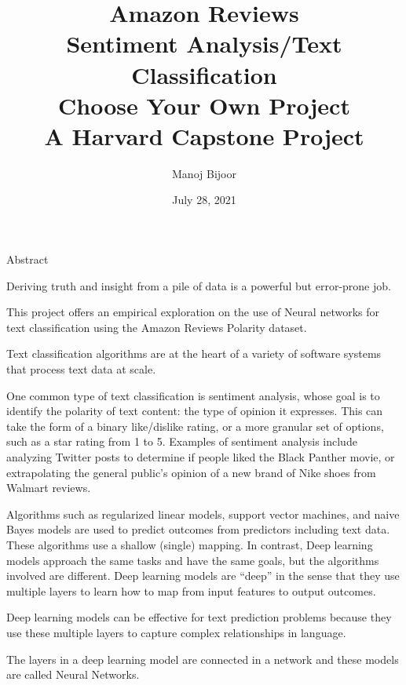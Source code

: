 \documentclass[
]{article}
\title{Amazon Reviews\\
Sentiment Analysis/Text Classification\\
Choose Your Own Project\\
A Harvard Capstone Project}
\author{Manoj Bijoor}
\date{July 28, 2021}
\begin{document}
\maketitle



\newpage

\newpage

\begin{center}

\hypertarget{Abstract}{}
\large{Abstract}

\end{center}

\bigskip

Deriving truth and insight from a pile of data is a powerful but
error-prone job.

This project offers an empirical exploration on the use of Neural
networks for text classification using the Amazon Reviews Polarity
dataset.

Text classification algorithms are at the heart of a variety of software
systems that process text data at scale.

One common type of text classification is sentiment analysis, whose goal
is to identify the polarity of text content: the type of opinion it
expresses. This can take the form of a binary like/dislike rating, or a
more granular set of options, such as a star rating from 1 to 5.
Examples of sentiment analysis include analyzing Twitter posts to
determine if people liked the Black Panther movie, or extrapolating the
general public's opinion of a new brand of Nike shoes from Walmart
reviews.

Algorithms such as regularized linear models, support vector machines,
and naive Bayes models are used to predict outcomes from predictors
including text data. These algorithms use a shallow (single) mapping. In
contrast, Deep learning models approach the same tasks and have the same
goals, but the algorithms involved are different. Deep learning models
are ``deep'' in the sense that they use multiple layers to learn how to
map from input features to output outcomes.

Deep learning models can be effective for text prediction problems
because they use these multiple layers to capture complex relationships
in language.

The layers in a deep learning model are connected in a network and these
models are called Neural Networks.
\end{document}
